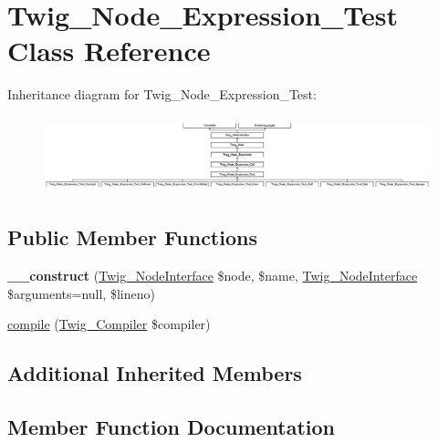 \hypertarget{classTwig__Node__Expression__Test}{}\section{Twig\+\_\+\+Node\+\_\+\+Expression\+\_\+\+Test Class Reference}
\label{classTwig__Node__Expression__Test}
Inheritance diagram for Twig\+\_\+\+Node\+\_\+\+Expression\+\_\+\+Test\+:\begin{figure}[H]
\begin{center}
\leavevmode
\includegraphics[height=2.231076cm]{classTwig__Node__Expression__Test}
\end{center}
\end{figure}
\subsection*{Public Member Functions}
\begin{DoxyCompactItemize}
\item 
{\bfseries \+\_\+\+\_\+construct} (\hyperlink{interfaceTwig__NodeInterface}{Twig\+\_\+\+Node\+Interface} \$node, \$name, \hyperlink{interfaceTwig__NodeInterface}{Twig\+\_\+\+Node\+Interface} \$arguments=null, \$lineno)\hypertarget{classTwig__Node__Expression__Test_a8dbcddc69453e3d1d349872509fa6670}{}\label{classTwig__Node__Expression__Test_a8dbcddc69453e3d1d349872509fa6670}

\item 
\hyperlink{classTwig__Node__Expression__Test_a9ea7b89cd346653fb1de709a3aee64e5}{compile} (\hyperlink{classTwig__Compiler}{Twig\+\_\+\+Compiler} \$compiler)
\end{DoxyCompactItemize}
\subsection*{Additional Inherited Members}


\subsection{Member Function Documentation}
